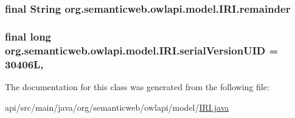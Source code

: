 \hypertarget{classorg_1_1semanticweb_1_1owlapi_1_1model_1_1_i_r_i_a51edec49810ba85d08fa247e1ebcbe76}{
\subsubsection[{remainder}]{\setlength{\rightskip}{0pt plus 5cm}final String org.\-semanticweb.\-owlapi.\-model.\-I\-R\-I.\-remainder\hspace{0.3cm}{\ttfamily [private]}}}\label{classorg_1_1semanticweb_1_1owlapi_1_1model_1_1_i_r_i_a51edec49810ba85d08fa247e1ebcbe76}
\hypertarget{classorg_1_1semanticweb_1_1owlapi_1_1model_1_1_i_r_i_a0d6984c8954eeafa302d2fc7bc4f9e10}{
\subsubsection[{serial\-Version\-U\-I\-D}]{\setlength{\rightskip}{0pt plus 5cm}final long org.\-semanticweb.\-owlapi.\-model.\-I\-R\-I.\-serial\-Version\-U\-I\-D = 30406\-L\hspace{0.3cm}{\ttfamily [static]}, {\ttfamily [private]}}}\label{classorg_1_1semanticweb_1_1owlapi_1_1model_1_1_i_r_i_a0d6984c8954eeafa302d2fc7bc4f9e10}


The documentation for this class was generated from the following file\-:\begin{DoxyCompactItemize}
\item 
api/src/main/java/org/semanticweb/owlapi/model/\hyperlink{_i_r_i_8java}{I\-R\-I.\-java}\end{DoxyCompactItemize}
